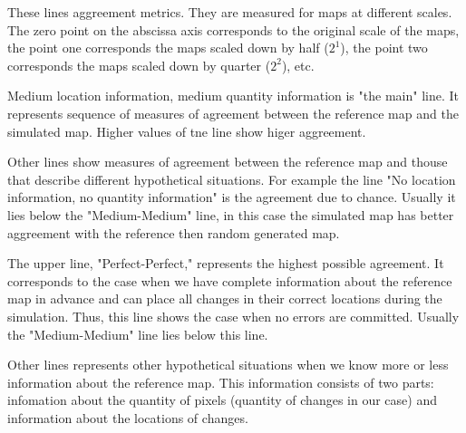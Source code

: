 \documentclass{report}
\begin{document}
These lines aggreement metrics. They are measured for maps at different scales. 
The zero point on the abscissa axis corresponds to
the original scale of the maps, the point one corresponds the maps scaled down by half ($2^1$), the point
two corresponds the maps scaled down by quarter ($2^2$), etc.

Medium location information, medium quantity information is "the main" line.
It represents sequence of measures of agreement between the reference map and the simulated map.
Higher values of tne line show higer aggreement.

Other lines show  measures of agreement between the reference map and thouse that describe different hypothetical situations.
For example the line "No location information, no quantity information"  is the agreement due to chance.
Usually it lies below the "Medium-Medium" line, in this case the simulated map has better aggreement with the reference 
then random generated map.

The upper line, "Perfect-Perfect," represents the highest possible agreement.
It corresponds to the case when we have complete information about the reference map in advance 
and can place all changes in their correct locations during the simulation.
Thus, this line shows the case when no errors are committed.
Usually the "Medium-Medium" line lies below this line.

Other lines represents other hypothetical situations when we know more or less information
about the reference map. This information consists of two parts: infomation about the quantity of pixels (quantity of changes in our case)
and information about the locations of changes.









\end{document}
